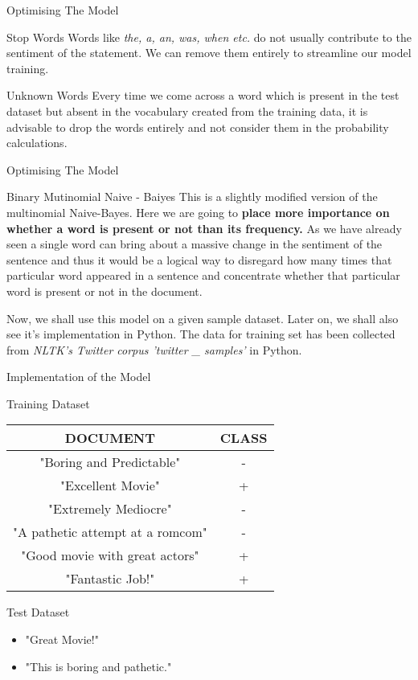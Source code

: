 \documentclass[usenames,dvipsnames]{beamer}
\begin{document}
\begin{frame}{Optimising The Model}
	\begin{block}{Stop Words}
		Words like \textit{the, a, an, was, when etc.} do not usually contribute to the sentiment of the statement. We can remove them entirely to streamline our model training.
	\end{block}
\begin{block}{Unknown Words}
	Every time we come across a word which is present in the test dataset but absent in the vocabulary created from the training data, it is advisable to drop the words entirely and not consider them in the probability calculations.
\end{block}
\end{frame}
\begin{frame}{Optimising The Model}
	\begin{block}{Binary Mutinomial Naive - Baiyes}
		This is a slightly modified version of the multinomial Naive-Bayes. Here we are going to \textbf{place more importance on whether a word is present or not than its frequency.} As we have already seen a single word can bring about a massive change in the sentiment of the sentence and thus it would be a logical way to disregard how many times that particular word appeared in a sentence and concentrate whether that particular word is present or not in the document.
	\end{block}
\begin{block}{}
	Now, we shall use this model on a given sample dataset. Later on, we shall also see it's implementation in Python. The data for training set has been collected from \textit{NLTK's Twitter corpus 'twitter \_ samples'} in Python.
\end{block}
\end{frame}
\begin{frame}{Implementation of the Model}
	\begin{block}{Training Dataset}
		\begin{table}[]
			\begin{tabular}{|c|c|}
				\hline
				\textbf{DOCUMENT}               & \textbf{CLASS} \\ \hline
				"Boring and Predictable"         & -     \\ \hline
				"Excellent Movie"               & +     \\ \hline
				"Extremely Mediocre"             & -     \\ \hline
				"A pathetic attempt at a romcom" & -     \\ \hline
				"Good movie with great actors"   & +     \\ \hline
				"Fantastic Job!"                 & +     \\ \hline
			\end{tabular}
		\end{table}
	\end{block}
\begin{block}{Test Dataset}
	\begin{itemize}
		\item "Great Movie!"
		\item "This is boring and pathetic."
	\end{itemize}
\end{block}
\end{frame}
\end{document}
